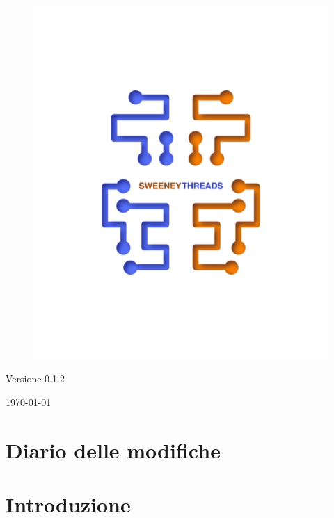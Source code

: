 \documentclass[a4paper]{article}
\begin{document}
\begin{titlepage}
		\begin{figure}[H]
			\centering
			\includegraphics[scale=0.8]{sweeney.png}
		\end{figure}
		\begin{center}
			Versione 0.1.2
		\end{center}
		{\large \today}\\[3cm] 
		\vfill  
	\end{titlepage}
	
	
	\tableofcontents
	
	\newpage 
	\section*{Diario delle modifiche}

	\newpage \section{Introduzione}
\end{document}
